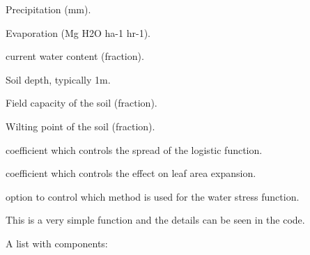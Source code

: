 \documentclass[letterpaper]{book}
\begin{document}
\begin{Arguments}
\begin{ldescription}
\item[\code{precipt}] Precipitation (mm).

\item[\code{evapo}] Evaporation (Mg H2O ha-1 hr-1).

\item[\code{cws}] current water content (fraction).

\item[\code{soildepth}] Soil depth, typically 1m.

\item[\code{fieldc}] Field capacity of the soil (fraction).

\item[\code{wiltp}] Wilting point of the soil (fraction).

\item[\code{phi1}] coefficient which controls the spread of the
logistic function.

\item[\code{phi2}] coefficient which controls the effect on leaf
area expansion.

\item[\code{wsFun}] option to control which method is used for
the water stress function.
\end{ldescription}
\end{Arguments}
%
\begin{Details}\relax
This is a very simple function and the details can be seen
in the code.
\end{Details}
%
\begin{Value}
A list with components:
\end{Value}
%
\begin{SeeAlso}\relax
{}
\end{SeeAlso}
%
\end{document}
